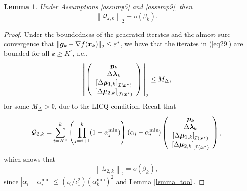 \documentclass[aos]{imsart}
\numberwithin{equation}{section}
\theoremstyle{plain}
\newtheorem{lemma}{Lemma}
\begin{document}
\begin{appendix}
\begin{lemma}
\label{lemma16}
    Under Assumptions \ref{assump5} and  \ref{assump9}, 
    then 
    \begin{equation*}
        \left\|\mathcal{Q}_{2,k} \right\|_2 = o\left( \beta_k \right).
    \end{equation*}
\end{lemma}

\begin{proof}
    Under the boundedness of the generated iterates and the almost sure convergence that $\left\| \Bar{\bm{g}}_k - \nabla f(\bm{x}_k) \right\|_2 \leq \varepsilon^{*}$, we have that the iterates in (\ref{eq29}) are bounded for all $k \geq K^{*}$, i.e., 
    \begin{equation*}
        \left\| \left( \begin{array}{c}
        \Bar{\bm{p}}_k \\
        \Delta \bm{\lambda}_{k}\\
        \left[\Delta \bm{\mu}_{1,k} \right]_{\mathcal{I}(\bm{x}^{*})} \\
        \left[\Delta \bm{\mu}_{2,k} \right]_{\mathcal{J}(\bm{x}^{*})}
    \end{array} \right) \right\|_2 \leq M_{\Delta},
    \end{equation*}
    for some $M_{\Delta} > 0$, due to the LICQ condition. Recall that 
    \begin{equation*}
        \mathcal{Q}_{2,k} = \sum_{i=K^{*}}^{k} \left( \prod_{j=i+1}^{k} (1-\alpha^{\min}_j) \right) (\alpha_i - \alpha^{\min}_i) \left( \begin{array}{c}
        \Bar{\bm{p}}_k \\
        \Delta \bm{\lambda}_{k}\\
        \left[\Delta \bm{\mu}_{1,k} \right]_{\mathcal{I}(\bm{x}^{*})} \\
        \left[\Delta \bm{\mu}_{2,k} \right]_{\mathcal{J}(\bm{x}^{*})}
        \end{array} \right),
    \end{equation*}
    which shows that
    \begin{equation*}
        \left\| \mathcal{Q}_{2,k} \right\|_2 = o\left( \beta_k \right),
    \end{equation*}
    since $|\alpha_i - \alpha^{\min}_i| \leq (\iota_0/\iota_1^2) (\alpha^{\min}_k)^2$ and Lemma \ref{lemma_tool}.
\end{proof}



\end{appendix}
\end{document}
